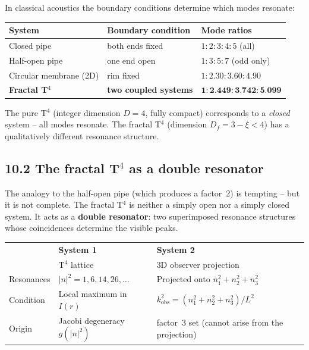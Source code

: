 In classical acoustics the boundary conditions determine which modes
resonate:

\begin{center}
\begin{tabular}{p{3.8cm}p{3.4cm}p{5.2cm}}
\toprule
\textbf{System} & \textbf{Boundary condition} & \textbf{Mode ratios} \\
\midrule
Closed pipe & both ends fixed & $1:2:3:4:5$ (all) \\
Half-open pipe & one end open & $1:3:5:7$ (odd only) \\
Circular membrane (2D) & rim fixed & $1:2{.}30:3{.}60:4{.}90$ \\
\midrule
\textbf{Fractal T$^4$} & \textbf{two coupled systems} &
  $\mathbf{1:2{.}449:3{.}742:5{.}099}$ \\
\bottomrule
\end{tabular}
\end{center}

The pure T$^4$ (integer dimension $D=4$, fully compact)
corresponds to a \emph{closed} system -- all modes resonate.
The fractal T$^4$ (dimension $D_f = 3-\xi < 4$) has a
qualitatively different resonance structure.

\subsection*{10.2 The fractal T$^4$ as a double resonator}

The analogy to the half-open pipe (which produces a factor~2) is
tempting -- but it is not complete. The fractal T$^4$ is
neither a simply open nor a simply closed system. It acts
as a \textbf{double resonator}: two superimposed resonance structures
whose coincidences determine the visible peaks.

\begin{center}
\begin{tabular}{p{3cm}p{5cm}p{5cm}}
\toprule
 & \textbf{System 1} & \textbf{System 2} \\
 & T$^4$ lattice & 3D observer projection \\
\midrule
Resonances & $|n|^2 = 1, 6, 14, 26, \ldots$ &
  Projected onto $n_1^2+n_2^2+n_3^2$ \\
Condition & Local maximum in $I(r)$ &
  $k_\mathrm{obs}^2 = (n_1^2+n_2^2+n_3^2)/L^2$ \\
Origin & Jacobi degeneracy $g(|n|^2)$ &
  factor~3 set (cannot arise from the projection) \\
\bottomrule
\end{tabular}
\end{center}

